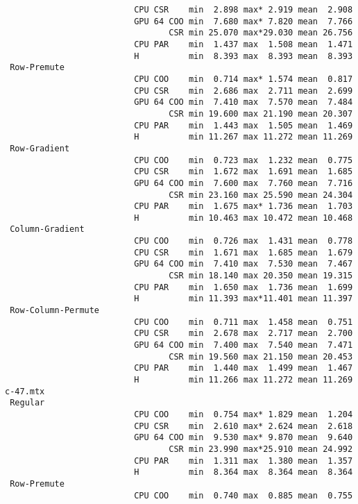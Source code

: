 {\begin{verbatim}
                          CPU CSR    min  2.898 max* 2.919 mean  2.908
                          GPU 64 COO min  7.680 max* 7.820 mean  7.766
                                 CSR min 25.070 max*29.030 mean 26.756
                          CPU PAR    min  1.437 max  1.508 mean  1.471
                          H          min  8.393 max  8.393 mean  8.393
 Row-Premute
                          CPU COO    min  0.714 max* 1.574 mean  0.817
                          CPU CSR    min  2.686 max  2.711 mean  2.699
                          GPU 64 COO min  7.410 max  7.570 mean  7.484
                                 CSR min 19.600 max 21.190 mean 20.307
                          CPU PAR    min  1.443 max  1.505 mean  1.469
                          H          min 11.267 max 11.272 mean 11.269
 Row-Gradient
                          CPU COO    min  0.723 max  1.232 mean  0.775
                          CPU CSR    min  1.672 max  1.691 mean  1.685
                          GPU 64 COO min  7.600 max  7.760 mean  7.716
                                 CSR min 23.160 max 25.590 mean 24.304
                          CPU PAR    min  1.675 max* 1.736 mean  1.703
                          H          min 10.463 max 10.472 mean 10.468
 Column-Gradient
                          CPU COO    min  0.726 max  1.431 mean  0.778
                          CPU CSR    min  1.671 max  1.685 mean  1.679
                          GPU 64 COO min  7.410 max  7.530 mean  7.467
                                 CSR min 18.140 max 20.350 mean 19.315
                          CPU PAR    min  1.650 max  1.736 mean  1.699
                          H          min 11.393 max*11.401 mean 11.397
 Row-Column-Permute
                          CPU COO    min  0.711 max  1.458 mean  0.751
                          CPU CSR    min  2.678 max  2.717 mean  2.700
                          GPU 64 COO min  7.400 max  7.540 mean  7.471
                                 CSR min 19.560 max 21.150 mean 20.453
                          CPU PAR    min  1.440 max  1.499 mean  1.467
                          H          min 11.266 max 11.272 mean 11.269
c-47.mtx
 Regular
                          CPU COO    min  0.754 max* 1.829 mean  1.204
                          CPU CSR    min  2.610 max* 2.624 mean  2.618
                          GPU 64 COO min  9.530 max* 9.870 mean  9.640
                                 CSR min 23.990 max*25.910 mean 24.992
                          CPU PAR    min  1.311 max  1.380 mean  1.357
                          H          min  8.364 max  8.364 mean  8.364
 Row-Premute
                          CPU COO    min  0.740 max  0.885 mean  0.755

\end{verbatim}}
